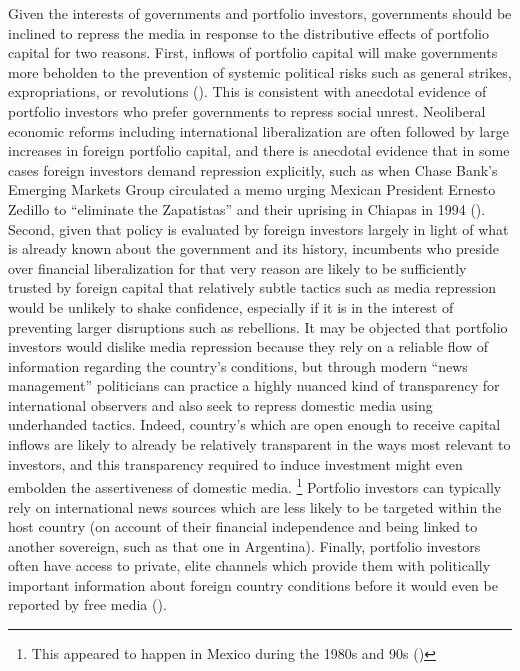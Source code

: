 \documentclass[12pt]{report}
\begin{document}
Given the interests of governments and portfolio investors, governments should be inclined to
repress the media in response to the distributive effects of portfolio capital for two reasons.
First, inflows of portfolio capital will make governments more beholden to the prevention of
systemic political risks such as general strikes, expropriations, or revolutions
(\citealt{Clark:1997jg}). This is consistent with anecdotal evidence of portfolio investors who
prefer governments to repress social unrest. Neoliberal economic reforms including international
liberalization are often followed by large increases in foreign portfolio capital, and there is
anecdotal evidence that in some cases foreign investors demand repression explicitly, such as when
Chase Bank's Emerging Markets Group circulated a memo urging Mexican President Ernesto Zedillo to
``eliminate the Zapatistas'' and their uprising in Chiapas in 1994 (\citealt{Silverstein:1995wc}).
Second, given that policy is evaluated by foreign investors largely in light of what is already
known about the government and its history, incumbents who preside over financial liberalization for
that very reason are likely to be sufficiently trusted by foreign capital that relatively subtle
tactics such as media repression would be unlikely to shake confidence, especially if it is in the
interest of preventing larger disruptions such as rebellions. It may be objected that portfolio
investors would dislike media repression because they rely on a reliable flow of information
regarding the country's conditions, but through modern ``news management'' politicians can practice
a highly nuanced kind of transparency for international observers and also seek to repress domestic
media using underhanded tactics. Indeed, country's which are open enough to receive capital inflows
are likely to already be relatively transparent in the ways most relevant to investors, and this
transparency required to induce investment might even embolden the assertiveness of domestic media.%
\footnote{This appeared to happen in Mexico during the 1980s and 90s (\citealt{lawson2002building})%
} Portfolio investors can typically rely on international news sources which are less likely to be
targeted within the host country (on account of their financial independence and being linked to
another sovereign, such as that one in Argentina). Finally, portfolio investors often have access to
private, elite channels which provide them with politically important information about foreign
country conditions before it would even be reported by free media (\citet{Dube:2011uv}).
\end{document}
